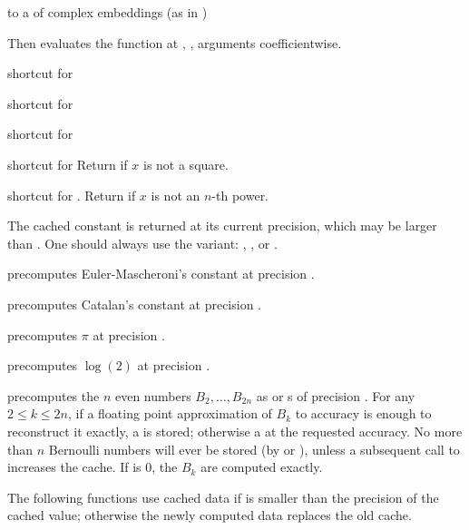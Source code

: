 \item {} to a  of complex embeddings (as in )

Then evaluates the function at , ,  arguments
coefficientwise.


 shortcut for 

 shortcut for 

 shortcut for 

 shortcut for 
Return  if $x$ is not a square.

 shortcut for . Return  if $x$ is not an $n$-th power.


The cached constant is returned at its current precision, which may be larger
than . One should always use the  variant:
, , or .

 precomputes Euler-Mascheroni's constant
at precision .

 precomputes Catalan's constant at precision
.

 precomputes $\pi$ at precision .

 precomputes $\log(2)$ at precision
.

 precomputes the $n$ even
 numbers $B_2,\dots,B_{2n}$ as  or s of
precision . For any $2 \leq k \leq 2n$, if a floating point
approximation of $B_k$ to accuracy  is enough to reconstruct it
exactly, a  is stored; otherwise a  at the requested
accuracy. No more than $n$ Bernoulli numbers will ever be stored (by
 or ), unless a subsequent call to 
increases the cache. If  is $0$, the $B_k$ are computed exactly.

The following functions use cached data if  is smaller than the
precision of the cached value; otherwise the newly computed data replaces the
old cache.

